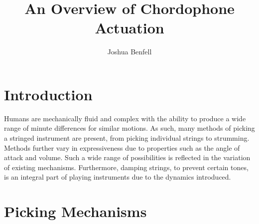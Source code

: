 \documentclass[12pt, a4paper, onecolumn]{IEEEtran}
\title{An Overview of Chordophone Actuation}
\author{Joshua Benfell}
\begin{document}
	\maketitle
    \section{Introduction}
        Humans are mechanically fluid and complex with the ability to produce a wide range of minute differences for similar motions. 
        As such, many methods of picking a stringed instrument are present, from picking individual strings to strumming. 
        Methods further vary in expressiveness due to properties such as the angle of attack and volume.
        Such a wide range of possibilities is reflected in the variation of existing mechanisms.
        Furthermore, damping strings, to prevent certain tones, is an integral part of playing instruments due to the dynamics introduced.
    \section{Picking Mechanisms}
\end{document}
